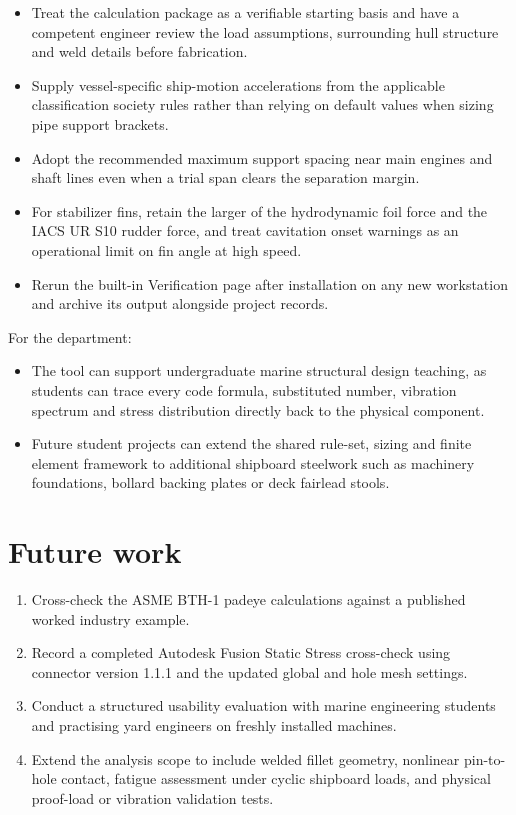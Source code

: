 \begin{itemize}
    \item Treat the calculation package as a verifiable starting basis and have
    a competent engineer review the load assumptions, surrounding hull
    structure and weld details before fabrication.
    \item Supply vessel-specific ship-motion accelerations from the applicable
    classification society rules rather than relying on default values when
    sizing pipe support brackets.
    \item Adopt the recommended maximum support spacing near main engines and
    shaft lines even when a trial span clears the separation margin.
    \item For stabilizer fins, retain the larger of the hydrodynamic foil force
    and the IACS UR S10 rudder force, and treat cavitation onset warnings as an
    operational limit on fin angle at high speed.
    \item Rerun the built-in Verification page after installation on any new
    workstation and archive its output alongside project records.
\end{itemize}

For the department:

\begin{itemize}
    \item The tool can support undergraduate marine structural design teaching,
    as students can trace every code formula, substituted number, vibration
    spectrum and stress distribution directly back to the physical component.
    \item Future student projects can extend the shared rule-set, sizing and
    finite element framework to additional shipboard steelwork such as
    machinery foundations, bollard backing plates or deck fairlead stools.
\end{itemize}

\section{Future work}
\label{sec:future-work}

\begin{enumerate}
    \item Cross-check the ASME BTH-1 padeye calculations against a published
    worked industry example.
    \item Record a completed Autodesk Fusion Static Stress cross-check using
    connector version 1.1.1 and the updated global and hole mesh settings.
    \item Conduct a structured usability evaluation with marine engineering
    students and practising yard engineers on freshly installed machines.
    \item Extend the analysis scope to include welded fillet geometry,
    nonlinear pin-to-hole contact, fatigue assessment under cyclic shipboard
    loads, and physical proof-load or vibration validation tests.
\end{enumerate}
